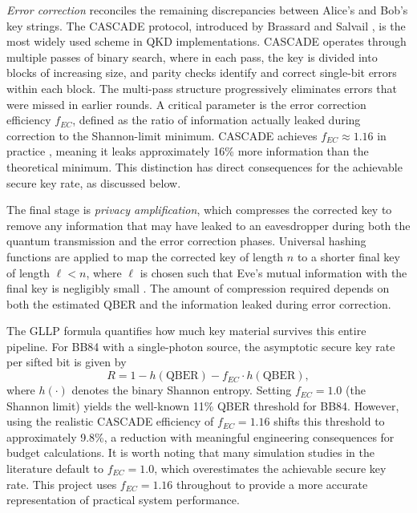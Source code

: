 \textit{Error correction} reconciles the remaining discrepancies between Alice's and Bob's key strings. The CASCADE protocol, introduced by Brassard and Salvail \cite{Cascade1994}, is the most widely used scheme in QKD implementations. CASCADE operates through multiple passes of binary search, where in each pass, the key is divided into blocks of increasing size, and parity checks identify and correct single-bit errors within each block. The multi-pass structure progressively eliminates errors that were missed in earlier rounds. A critical parameter is the error correction efficiency $f_{EC}$, defined as the ratio of information actually leaked during correction to the Shannon-limit minimum. CASCADE achieves $f_{EC} \approx 1.16$ in practice \cite{Cascade1994}, meaning it leaks approximately 16\% more information than the theoretical minimum. This distinction has direct consequences for the achievable secure key rate, as discussed below.

The final stage is \textit{privacy amplification}, which compresses the corrected key to remove any information that may have leaked to an eavesdropper during both the quantum transmission and the error correction phases. Universal hashing functions are applied to map the corrected key of length $n$ to a shorter final key of length $\ell < n$, where $\ell$ is chosen such that Eve's mutual information with the final key is negligibly small \cite{Bennett1995PA}. The amount of compression required depends on both the estimated QBER and the information leaked during error correction.

The GLLP formula \cite{GLLP2004} quantifies how much key material survives this entire pipeline. For BB84 with a single-photon source, the asymptotic secure key rate per sifted bit is given by
%
\begin{equation}
\label{eq:gllp}
R = 1 - h(\text{QBER}) - f_{EC} \cdot h(\text{QBER}),
\end{equation}
%
where $h(\cdot)$ denotes the binary Shannon entropy. Setting $f_{EC} = 1.0$ (the Shannon limit) yields the well-known 11\% QBER threshold for BB84. However, using the realistic CASCADE efficiency of $f_{EC} = 1.16$ shifts this threshold to approximately 9.8\%, a reduction with meaningful engineering consequences for budget calculations. It is worth noting that many simulation studies in the literature default to $f_{EC} = 1.0$, which overestimates the achievable secure key rate. This project uses $f_{EC} = 1.16$ throughout to provide a more accurate representation of practical system performance.


